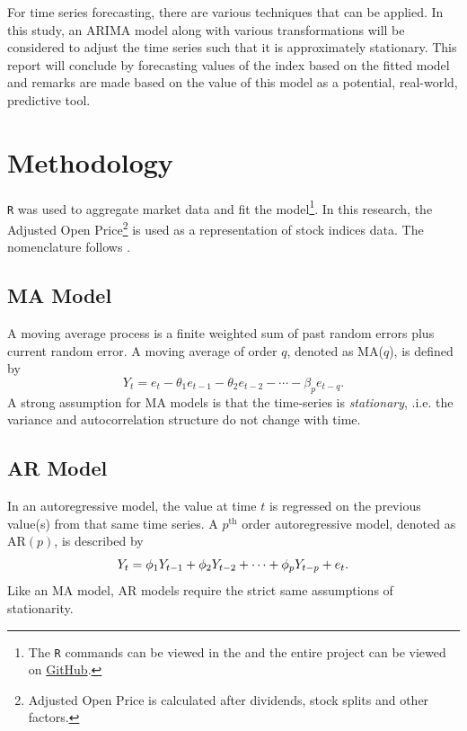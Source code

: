 \documentclass[12pt, centerh1]{article}
\begin{document}
For time series forecasting, there are various techniques that can be applied. In this study, an ARIMA model along with various transformations will be considered to adjust the time series such that it is approximately stationary. This report will conclude by forecasting values of the index based on the fitted model and remarks are made based on the value of this model as a potential, real-world, predictive tool.

\section{Methodology} \label{methodology}

\texttt{R} \citep{R} was used to aggregate market data and fit the model\footnote{The \texttt{R} commands can be viewed in the  and the entire project can be viewed on \href{https://github.com/grantwforsythe/ARIMA-Model}{GitHub}.}.  In this research, the Adjusted Open Price\footnote{Adjusted Open Price is calculated after dividends, stock splits and other factors.} is used as a representation of stock indices data. The nomenclature follows \citet{cryer2008time}.

\subsection{MA Model}
A moving average process is a finite weighted sum of past random errors plus current random error. A moving average of order $q$, denoted as MA($q$), is defined by
\begin{equation}\label{eq:MA}
    Y_t = e_t - \theta_1e_{t-1} - \theta_2e_{t-2} - \cdots - \beta_pe_{t-q}.
\end{equation}
A strong assumption for MA models is that the time-series is \textit{stationary}, .i.e. the variance and autocorrelation structure do not change with time. 

\subsection{AR Model}
In an autoregressive model, the value at time $t$ is regressed on the previous value(s) from that same time series. A $p^{\text{th}}$ order autoregressive model, denoted as AR$(p)$, is described by
\begin{equation}\label{eq:AR}
    \centering
    Y_t = \phi_1Y_{t-1} + \phi_2Y_{t-2} + \cdots + \phi_pY_{t-p} + e_t.
\end{equation} 
Like an MA model, AR models require the strict same assumptions of stationarity.
\end{document}

